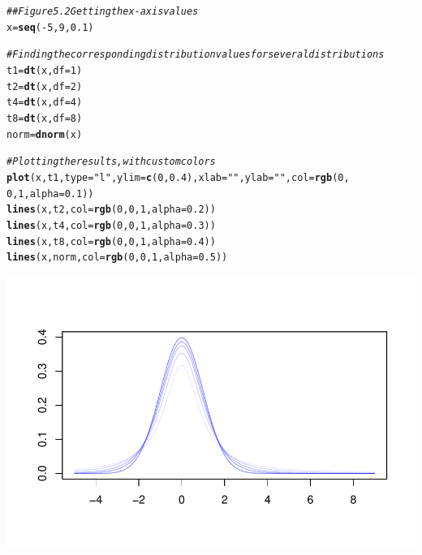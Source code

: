 \documentclass{report}\usepackage[]{graphicx}\usepackage[]{color}
\makeatletter
\def\maxwidth{ %
  \ifdim\Gin@nat@width>\linewidth
    \linewidth
  \else
    \Gin@nat@width
  \fi
}
\newcommand{\hlnum}[1]{\textcolor[rgb]{0.686,0.059,0.569}{#1}}%
\newcommand{\hlstr}[1]{\textcolor[rgb]{0.192,0.494,0.8}{#1}}%
\newcommand{\hlcom}[1]{\textcolor[rgb]{0.678,0.584,0.686}{\textit{#1}}}%
\newcommand{\hlopt}[1]{\textcolor[rgb]{0,0,0}{#1}}%
\newcommand{\hlstd}[1]{\textcolor[rgb]{0.345,0.345,0.345}{#1}}%
\newcommand{\hlkwb}[1]{\textcolor[rgb]{0.69,0.353,0.396}{#1}}%
\newcommand{\hlkwc}[1]{\textcolor[rgb]{0.333,0.667,0.333}{#1}}%
\newcommand{\hlkwd}[1]{\textcolor[rgb]{0.737,0.353,0.396}{\textbf{#1}}}%
\newenvironment{kframe}{%
 \def\at@end@of@kframe{}%
 \ifinner\ifhmode%
  \def\at@end@of@kframe{\end{minipage}}%
  \begin{minipage}{\columnwidth}%
 \fi\fi%
 \def\FrameCommand##1{\hskip\@totalleftmargin \hskip-\fboxsep
 \colorbox{shadecolor}{##1}\hskip-\fboxsep
     \hskip-\linewidth \hskip-\@totalleftmargin \hskip\columnwidth}%
 \MakeFramed {\advance\hsize-\width
   \@totalleftmargin\z@ \linewidth\hsize
   \@setminipage}}%
 {\par\unskip\endMakeFramed%
 \at@end@of@kframe}
\newenvironment{knitrout}{}{} %
\makeatother
\begin{document}
\begin{knitrout}
\color{fgcolor}\begin{kframe}
\begin{alltt}
\hlcom{## Figure 5.2 Getting the x-axis values}
\hlstd{x} \hlkwb{=} \hlkwd{seq}\hlstd{(}\hlopt{-}\hlnum{5}\hlstd{,} \hlnum{9}\hlstd{,} \hlnum{0.1}\hlstd{)}

\hlcom{# Finding the corresponding distribution values for several distributions}
\hlstd{t1} \hlkwb{=} \hlkwd{dt}\hlstd{(x,} \hlkwc{df} \hlstd{=} \hlnum{1}\hlstd{)}
\hlstd{t2} \hlkwb{=} \hlkwd{dt}\hlstd{(x,} \hlkwc{df} \hlstd{=} \hlnum{2}\hlstd{)}
\hlstd{t4} \hlkwb{=} \hlkwd{dt}\hlstd{(x,} \hlkwc{df} \hlstd{=} \hlnum{4}\hlstd{)}
\hlstd{t8} \hlkwb{=} \hlkwd{dt}\hlstd{(x,} \hlkwc{df} \hlstd{=} \hlnum{8}\hlstd{)}
\hlstd{norm} \hlkwb{=} \hlkwd{dnorm}\hlstd{(x)}

\hlcom{# Plotting the results, with custom colors}
\hlkwd{plot}\hlstd{(x, t1,} \hlkwc{type} \hlstd{=} \hlstr{"l"}\hlstd{,} \hlkwc{ylim} \hlstd{=} \hlkwd{c}\hlstd{(}\hlnum{0}\hlstd{,} \hlnum{0.4}\hlstd{),} \hlkwc{xlab} \hlstd{=} \hlstr{""}\hlstd{,} \hlkwc{ylab} \hlstd{=} \hlstr{""}\hlstd{,} \hlkwc{col} \hlstd{=} \hlkwd{rgb}\hlstd{(}\hlnum{0}\hlstd{,}
    \hlnum{0}\hlstd{,} \hlnum{1}\hlstd{,} \hlkwc{alpha} \hlstd{=} \hlnum{0.1}\hlstd{))}
\hlkwd{lines}\hlstd{(x, t2,} \hlkwc{col} \hlstd{=} \hlkwd{rgb}\hlstd{(}\hlnum{0}\hlstd{,} \hlnum{0}\hlstd{,} \hlnum{1}\hlstd{,} \hlkwc{alpha} \hlstd{=} \hlnum{0.2}\hlstd{))}
\hlkwd{lines}\hlstd{(x, t4,} \hlkwc{col} \hlstd{=} \hlkwd{rgb}\hlstd{(}\hlnum{0}\hlstd{,} \hlnum{0}\hlstd{,} \hlnum{1}\hlstd{,} \hlkwc{alpha} \hlstd{=} \hlnum{0.3}\hlstd{))}
\hlkwd{lines}\hlstd{(x, t8,} \hlkwc{col} \hlstd{=} \hlkwd{rgb}\hlstd{(}\hlnum{0}\hlstd{,} \hlnum{0}\hlstd{,} \hlnum{1}\hlstd{,} \hlkwc{alpha} \hlstd{=} \hlnum{0.4}\hlstd{))}
\hlkwd{lines}\hlstd{(x, norm,} \hlkwc{col} \hlstd{=} \hlkwd{rgb}\hlstd{(}\hlnum{0}\hlstd{,} \hlnum{0}\hlstd{,} \hlnum{1}\hlstd{,} \hlkwc{alpha} \hlstd{=} \hlnum{0.5}\hlstd{))}
\end{alltt}
\end{kframe}

{\centering \includegraphics[width=\maxwidth]{figure/unnamed-chunk-114-1} 

}



\end{knitrout}
\end{document}
